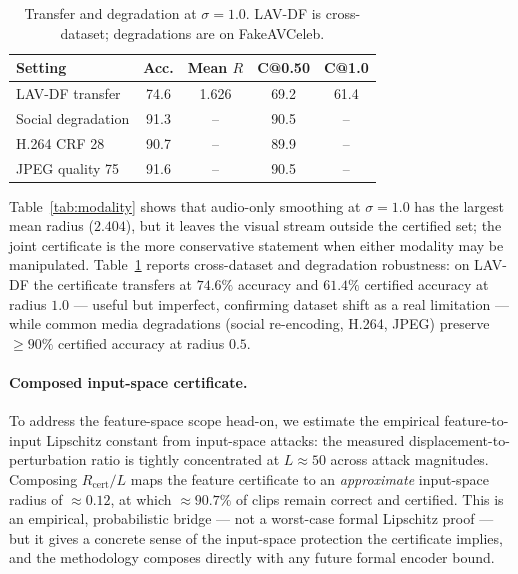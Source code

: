 \begin{table}[t]
\centering
\caption{Transfer and degradation at $\sigma=1.0$. LAV-DF is cross-dataset; degradations are on FakeAVCeleb.}
\label{tab:transfer}
\footnotesize
\setlength{\tabcolsep}{4pt}
\begin{tabular}{lcccc}
\toprule
Setting & Acc. & Mean $R$ & C@0.50 & C@1.0 \\
\midrule
LAV-DF transfer    & 74.6 & 1.626 & 69.2 & 61.4 \\
Social degradation & 91.3 & --    & 90.5 & -- \\
H.264 CRF 28       & 90.7 & --    & 89.9 & -- \\
JPEG quality 75    & 91.6 & --    & 90.5 & -- \\
\bottomrule
\end{tabular}
\end{table}

Table~\ref{tab:modality} shows that audio-only smoothing at $\sigma=1.0$ has the largest mean radius ($2.404$), but it leaves the visual stream outside the certified set; the joint certificate is the more conservative statement when either modality may be manipulated. Table~\ref{tab:transfer} reports cross-dataset and degradation robustness: on LAV-DF the certificate transfers at $74.6\%$ accuracy and $61.4\%$ certified accuracy at radius $1.0$ --- useful but imperfect, confirming dataset shift as a real limitation --- while common media degradations (social re-encoding, H.264, JPEG) preserve $\ge 90\%$ certified accuracy at radius $0.5$.

\paragraph{Composed input-space certificate.}
To address the feature-space scope head-on, we estimate the empirical feature-to-input Lipschitz constant from input-space attacks: the measured displacement-to-perturbation ratio is tightly concentrated at $L\!\approx\!50$ across attack magnitudes. Composing $R_{\mathrm{cert}}/L$ maps the feature certificate to an \emph{approximate} input-space radius of $\approx\!0.12$, at which $\approx\!90.7\%$ of clips remain correct and certified. This is an empirical, probabilistic bridge --- not a worst-case formal Lipschitz proof --- but it gives a concrete sense of the input-space protection the certificate implies, and the methodology composes directly with any future formal encoder bound.
